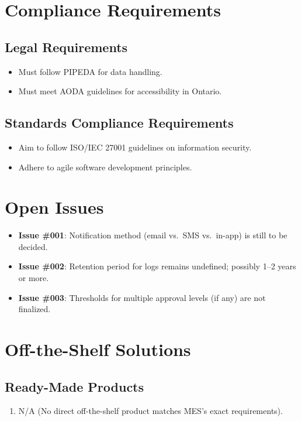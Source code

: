 \documentclass[12pt]{article}
\begin{document}
\section{Compliance Requirements}
\subsection{Legal Requirements}
\begin{itemize}
    \item Must follow PIPEDA for data handling.
    \item Must meet AODA guidelines for accessibility in Ontario.
\end{itemize}

\subsection{Standards Compliance Requirements}
\begin{itemize}
    \item Aim to follow ISO/IEC 27001 guidelines on information security.
    \item Adhere to agile software development principles.
\end{itemize}

\section{Open Issues}
\begin{itemize}
  \item \textbf{Issue \#001}: Notification method (email vs.\ SMS vs.\ in-app) is still to be decided.
  \item \textbf{Issue \#002}: Retention period for logs remains undefined; possibly 1--2 years or more.
  \item \textbf{Issue \#003}: Thresholds for multiple approval levels (if any) are not finalized.
\end{itemize}

\section{Off-the-Shelf Solutions}
\subsection{Ready-Made Products}
\begin{enumerate}
  \item N/A (No direct off-the-shelf product matches MES’s exact requirements).
\end{enumerate}
\end{document}
